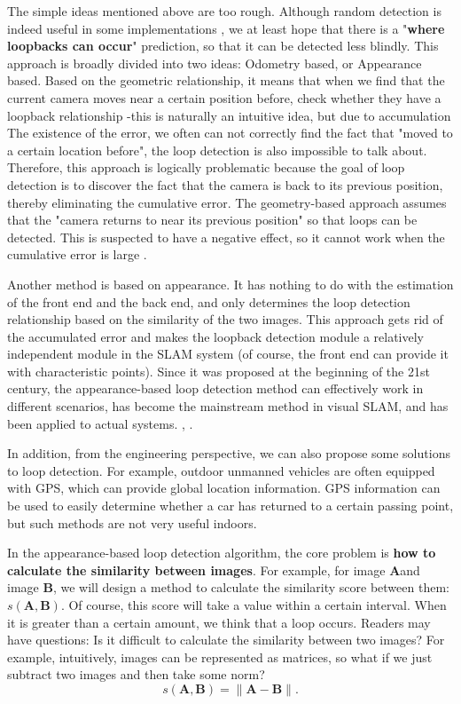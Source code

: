 The simple ideas mentioned above are too rough. Although random detection is indeed useful in some implementations \textsuperscript{\cite{Endres2014}}, we at least hope that there is a "\textbf{where loopbacks can occur}" prediction, so that it can be detected less blindly. This approach is broadly divided into two ideas: Odometry based, or Appearance based. Based on the geometric relationship, it means that when we find that the current camera moves near a certain position before, check whether they have a loopback relationship \textsuperscript{\cite{Hahnel2003}}-this is naturally an intuitive idea, but due to accumulation The existence of the error, we often can not correctly find the fact that "moved to a certain location before", the loop detection is also impossible to talk about. Therefore, this approach is logically problematic because the goal of loop detection is to discover the fact that the camera is back to its previous position, thereby eliminating the cumulative error. The geometry-based approach assumes that the "camera returns to near its previous position" so that loops can be detected. This is suspected to have a negative effect, so it cannot work when the cumulative error is large \textsuperscript{\cite{Beeson2010}}.

Another method is based on appearance. It has nothing to do with the estimation of the front end and the back end, and only determines the loop detection relationship based on the similarity of the two images. This approach gets rid of the accumulated error and makes the loopback detection module a relatively independent module in the SLAM system (of course, the front end can provide it with characteristic points). Since it was proposed at the beginning of the 21st century, the appearance-based loop detection method can effectively work in different scenarios, has become the mainstream method in visual SLAM, and has been applied to actual systems. , \cite{Mur-Artal2015}.

In addition, from the engineering perspective, we can also propose some solutions to loop detection. For example, outdoor unmanned vehicles are often equipped with GPS, which can provide global location information. GPS information can be used to easily determine whether a car has returned to a certain passing point, but such methods are not very useful indoors.

In the appearance-based loop detection algorithm, the core problem is \textbf{how to calculate the similarity between images}. For example, for image $\bm{A} $and image $\bm{B} $, we will design a method to calculate the similarity score between them: $s (\bm{A}, \bm{B }) $. Of course, this score will take a value within a certain interval. When it is greater than a certain amount, we think that a loop occurs. Readers may have questions: Is it difficult to calculate the similarity between two images? For example, intuitively, images can be represented as matrices, so what if we just subtract two images and then take some norm?
\clearpage
\begin{equation}
s(\bm{A}, \bm{B}) = \| \bm{A}-\bm{B} \|.
\end{equation}

